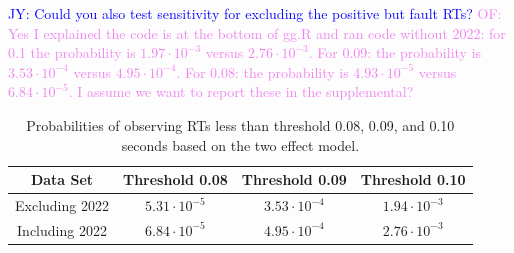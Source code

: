 \documentclass[12pt, letterpaper]{article}
\newcommand{\jy}[1]{\textcolor{blue}{JY: #1}}
\newcommand{\of}[1]{\textcolor{violet}{OF: #1}}
\begin{document}



\jy{Could you also test sensitivity for excluding the positive but
  fault RTs?}
\of{Yes I explained the code is at the bottom of gg.R and ran code without 2022: for 0.1 the
probability is $1.97\cdot10^{-3}$ versus $2.76\cdot10^{-3}$. For 0.09: the
probability is $3.53\cdot10^{-4}$ versus $4.95\cdot10^{-4}$. For 0.08: the
probability is $4.93\cdot10^{-5}$ versus $6.84\cdot10^{-5}$. I assume we want
to report these in the supplemental?}

\begin{table}
  \centering
  \caption{Probabilities of observing RTs less than threshold 0.08,
  0.09, and 0.10 seconds based on the two effect model.}
  \begin{tabular}{c c c c}
   \toprule
   Data Set & Threshold 0.08 & Threshold 0.09 & Threshold 0.10  \\
   \midrule
   Excluding 2022 & $5.31\cdot10^{-5}$ & $3.53\cdot10^{-4}$ &  $1.94\cdot10^{-3}$  \\
   Including 2022 & $6.84\cdot10^{-5}$ & $4.95\cdot10^{-4}$ & $2.76\cdot10^{-3}$ \\
   \bottomrule
  \end{tabular}
  \label{tab:Sim_probability}
\end{table}
\end{document}
